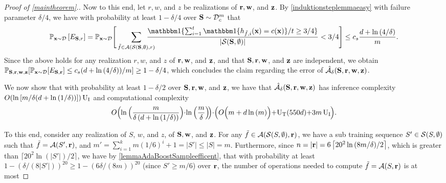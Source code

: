 \begin{proof}[Proof of \cref{maintheorem}.]
Now to this end, let $r,w$, and $z$ be realizations of $\mathbf{r},\mathbf{w}$, and $\mathbf{z}$. By \cref{induktionsteplemmaeasy} with failure parameter $\delta/4$, we have with probability at least $1-\delta/4$ over $\mathbf{S}\sim \mathcal{D}_{c}^{m}$ that 
\begin{align*}
 \p_{\rx\sim \cD}\left[E_{\rS,r}\right]= \p_{\rx\sim \cD}\Bigg[   
  \sum_{\tilde{f}\in \cA(\cS(\rS,\emptyset),r)} \negmedspace \negmedspace \negmedspace  \negmedspace \negmedspace \negmedspace \frac{\ind\{\sum_{i=1}^{t} \ind\{h_{\tilde{f},i}(\rx)=c(\rx)\}/t\geq 3/4\}}{|\cS(\rS,\emptyset)|}
   <3/4 \Bigg]\leq \cs \frac{d+\ln{\left(4/\delta \right)}}{m}.
\end{align*}
Since the above holds for any realization $r,w$, and $z$ of $ \mathbf{r},\mathbf{w} $, and $ \mathbf{z} $, and that $\mathbf{S},\mathbf{r},\mathbf{w}$, and $ \mathbf{z} $ are independent, we obtain $
 \mathbb{P}_{\mathbf{S},\mathbf{r},\mathbf{w},\mathbf{z}}[ \mathbb{P}_{\mathbf{x}\sim \mathcal{D}}[E_{\mathbf{S},\mathbf{r}}]\leq c_s (d+\ln{\left(4/\delta \right)})/m] \geq 1-\delta/4$,
which concludes the claim regarding the error of $ \mathcal{\hat{A}}_{\delta}(\mathbf{S},\mathbf{r},\mathbf{w},\mathbf{z}) $.

We now show that with probability at least $1-\delta/2$ over $\mathbf{S},\mathbf{r},\mathbf{w}$, and $\mathbf{z}$, we have that $\mathcal{\hat{A}}_{\delta}(\mathbf{S},\mathbf{r},\mathbf{w},\mathbf{z})$ has inference complexity $ O(\ln{[m /\delta(d+\ln{\left(1/\delta \right)}) ]}) \operatorname{U_{I}} $ and computational complexity
\begin{align*}
 O\Big(\negmedspace\ln{\Big(\frac{m}{\delta\left(d+\ln{\left(1/\delta \right)}\right)} \Big)}\negmedspace\cdot\negmedspace\ln{\Big(\frac{m}{\delta} \Big)}\negmedspace\Big)\negmedspace\cdot \negmedspace\Big(O\Big(m+d\ln{\left(m \right)}\Big)\negmedspace+\negmedspace\Utrain(550d)\negmedspace+\negmedspace 3m\Uinf\negmedspace\Big).
 \end{align*} 

To this end, consider any realization of $S$, $ w $, and $ z $, of $\mathbf{S},\mathbf{w}$, and $\mathbf{z}$. For any $\tilde{f} \in \mathcal{A}(\mathcal{S}(S,\emptyset),\mathbf{r})$, we have a sub training sequence $S'\in \mathcal{S}(S,\emptyset)$ such that $\tilde{f}=\mathcal{A}(S',\mathbf{r})$, and $m'=\sum_{i=1}^{k} m(1/6)^{i} + 1 =|S'|\leq |S|=m$. Furthermore, since $n=|\mathbf{r}|=6\left\lceil20^{2}\ln{\left(8m/\delta \right)}/2\right\rceil$, which is greater than $\lceil20^{2}\ln{(|S'|)}/2\rceil$, we have by \cref{lemmaAdaBoostSampleefficent}, that with probability at least $1-(\delta/(8|S'|))^{20}\geq 1-(6\delta/(8m))^{20}$ (since $S'\geq m/6$) over $\mathbf{r}$, the number of operations needed to compute $\tilde{f}=\mathcal{A}(S,\mathbf{r})$ is at most 


\end{proof}
